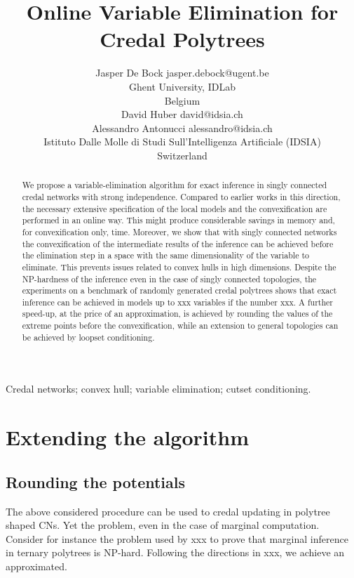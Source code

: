 \documentclass[twoside,11pt]{article}
\begin{document}
\title{Online Variable Elimination for Credal Polytrees}
\author{\name Jasper De Bock \email jasper.debock@ugent.be\\
\addr Ghent University, IDLab\\
Belgium\\
\AND
\name David Huber \email david@idsia.ch\\
\name Alessandro Antonucci \email alessandro@idsia.ch\\
\addr Istituto Dalle Molle di Studi Sull'Intelligenza Artificiale (IDSIA)\\
Switzerland}
\maketitle
\begin{abstract}%
We propose a variable-elimination algorithm for exact inference in singly connected credal networks with strong independence. Compared to earlier works in this direction, the necessary extensive specification of the local models and the convexification are performed in an online way. This might produce considerable savings in memory and, for convexification only, time. Moreover, we show that with singly connected networks the convexification of the intermediate results of the inference can be achieved before the elimination step in a space with the same dimensionality of the variable to eliminate. This prevents issues related to convex hulls in high dimensions. Despite the NP-hardness of the inference even in the case of singly connected topologies, the experiments on a benchmark of randomly generated credal polytrees shows that exact inference can be achieved in models up to xxx variables if the number xxx. A further speed-up, at the price of an approximation, is achieved by rounding the values of the extreme points before the convexification, while an extension to general topologies can be achieved by loopset conditioning.
\end{abstract}
\begin{keywords}
Credal networks; convex hull; variable elimination; cutset conditioning.
\end{keywords}





%
\section{Extending the algorithm}
\subsection{Rounding the potentials}
The above considered procedure can be used to credal updating in polytree shaped CNs. Yet the problem, even in the case of marginal computation. Consider for instance the problem used by xxx to prove that marginal inference in ternary polytrees is NP-hard. Following the directions in xxx, we achieve an approximated.
\end{document}
